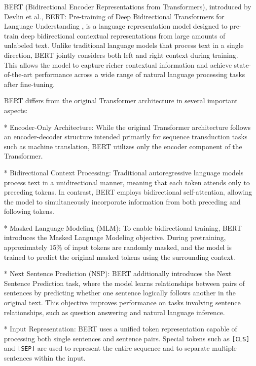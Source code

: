 \begin{markdown}

BERT (Bidirectional Encoder Representations from Transformers), introduced by Devlin et al., BERT: Pre-training of Deep Bidirectional Transformers for Language Understanding \cite{devlin_bert_2019}, is a language representation model designed to pre-train deep bidirectional contextual representations from large amounts of unlabeled text. Unlike traditional language models that process text in a single direction, BERT jointly considers both left and right context during training. This allows the model to capture richer contextual information and achieve state-of-the-art performance across a wide range of natural language processing tasks after fine-tuning.

BERT differs from the original Transformer architecture in several important aspects:

* Encoder-Only Architecture: While the original Transformer architecture follows an encoder-decoder structure intended primarily for sequence transduction tasks such as machine translation, BERT utilizes only the encoder component of the Transformer.

* Bidirectional Context Processing: Traditional autoregressive language models process text in a unidirectional manner, meaning that each token attends only to preceding tokens. In contrast, BERT employs bidirectional self-attention, allowing the model to simultaneously incorporate information from both preceding and following tokens.

* Masked Language Modeling (MLM): To enable bidirectional training, BERT introduces the Masked Language Modeling objective. During pretraining, approximately 15\% of input tokens are randomly masked, and the model is trained to predict the original masked tokens using the surrounding context.

* Next Sentence Prediction (NSP): BERT additionally introduces the Next Sentence Prediction task, where the model learns relationships between pairs of sentences by predicting whether one sentence logically follows another in the original text. This objective improves performance on tasks involving sentence relationships, such as question answering and natural language inference.

* Input Representation: BERT uses a unified token representation capable of processing both single sentences and sentence pairs. Special tokens such as \texttt{[CLS]} and \texttt{[SEP]} are used to represent the entire sequence and to separate multiple sentences within the input.

\end{markdown}

